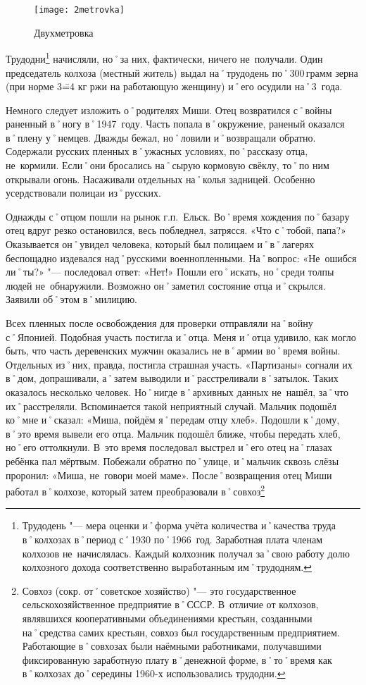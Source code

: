 \begin{wrapfigure}{O}{.25\textwidth}
\centering
\texttt{[image: 2metrovka]}
\caption[Двухметровка]{Двухметровка\footnotemark}
\label{fig:2metrovka}
\end{wrapfigure}

Трудодни\footnote{Трудодень "--- мера оценки и˚форма учёта количества и˚качества труда в˚колхозах в˚период с˚1930 по˚1966~год. Заработная плата членам колхозов не~начислялась. Каждый колхозник получал за˚свою работу долю колхозного дохода соответственно выработанным им˚трудодням.} начисляли, но˚за них, фактически, ничего не~получали. Один председатель колхоза (местный житель) выдал на˚трудодень по˚300\,грамм зерна (при норме 3\==4 кг ржи на работающую женщину) и˚его осудили на˚3~года.

Немного следует изложить о˚родителях Миши. Отец возвратился с˚войны раненный в˚ногу в˚1947~году. Часть попала в˚окружение, раненый оказался в˚плену у˚немцев. Дважды бежал, но˚ловили и˚возвращали обратно. Содержали русских пленных в˚ужасных условиях, по˚рассказу отца, не~кормили. Если˚они бросались на˚сырую кормовую свёклу, то˚по ним открывали огонь. Насаживали отдельных на˚колья задницей. Особенно усердствовали полицаи из˚русских. 

Однажды с˚отцом пошли на рынок г.п.~Ельск. Во˚время хождения по˚базару отец вдруг резко остановился, весь побледнел, затрясся. «Что с˚тобой, папа?» Оказывается он˚увидел человека, который был полицаем и˚в˚лагерях беспощадно издевался над˚русскими военнопленными. На˚вопрос: «Не~ошибся ли˚ты?» "--- последовал ответ: «Нет!» Пошли его˚искать, но˚среди толпы людей не~обнаружили. Возможно он˚заметил состояние отца и˚скрылся. Заявили об˚этом в˚милицию.

Всех пленных после освобождения для проверки отправляли на˚войну с˚Японией. Подобная участь постигла и˚отца. Меня и˚отца удивило, как могло быть, что часть деревенских мужчин оказались не в˚армии во˚время войны. Отдельных из˚них, правда, постигла страшная участь. «Партизаны» согнали их в˚дом, допрашивали, а˚затем выводили и˚расстреливали в˚затылок. Таких оказалось несколько человек. Но˚нигде в˚архивных данных не~нашёл, за˚что их˚расстреляли. Вспоминается такой неприятный случай. Мальчик подошёл ко˚мне и˚сказал: «Миша, пойдём я˚передам отцу хлеб». Подошли к˚дому, в˚это время вывели его отца. Мальчик подошёл ближе, чтобы передать хлеб, но˚его оттолкнули. В~это время последовал выстрел и˚его отец на˚глазах ребёнка пал мёртвым. Побежали обратно по˚улице, и˚мальчик сквозь слёзы проронил: «Миша, не~говори моей маме». 
После˚возвращения отец Миши работал в˚колхозе, который затем преобразовали в˚совхоз\footnote{Совхоз (сокр. от˚советское хозяйство) "--- это государственное сельскохозяйственное предприятие в˚СССР. В~отличие от колхозов, являвшихся кооперативными объединениями крестьян, созданными на˚средства самих крестьян, совхоз был государственным предприятием. Работающие в˚совхозах были наёмными работниками, получавшими фиксированную заработную плату в˚денежной форме, в˚то˚время как в˚колхозах до˚середины 1960-х использовались трудодни.}

